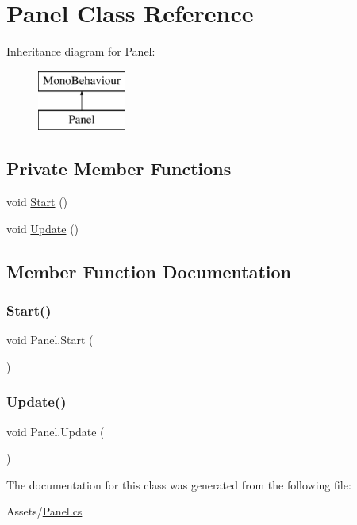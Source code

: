 \hypertarget{class_panel}{}\section{Panel Class Reference}
\label{class_panel}
Inheritance diagram for Panel\+:\begin{figure}[H]
\begin{center}
\leavevmode
\includegraphics[height=2.000000cm]{class_panel}
\end{center}
\end{figure}
\subsection*{Private Member Functions}
\begin{DoxyCompactItemize}
\item 
void \hyperlink{class_panel_aa88b843bea8cee778539d808204ac362}{Start} ()
\item 
void \hyperlink{class_panel_ad9014f25d89f2d6219c9c0e27205edea}{Update} ()
\end{DoxyCompactItemize}


\subsection{Member Function Documentation}
\mbox{\label{class_panel_aa88b843bea8cee778539d808204ac362}} 
\subsubsection{\texorpdfstring{Start()}{Start()}}
{\footnotesize\ttfamily void Panel.\+Start (\begin{DoxyParamCaption}{ }\end{DoxyParamCaption})\hspace{0.3cm}{\ttfamily [private]}}

\mbox{\label{class_panel_ad9014f25d89f2d6219c9c0e27205edea}} 
\subsubsection{\texorpdfstring{Update()}{Update()}}
{\footnotesize\ttfamily void Panel.\+Update (\begin{DoxyParamCaption}{ }\end{DoxyParamCaption})\hspace{0.3cm}{\ttfamily [private]}}



The documentation for this class was generated from the following file\+:\begin{DoxyCompactItemize}
\item 
Assets/\hyperlink{_panel_8cs}{Panel.\+cs}\end{DoxyCompactItemize}
